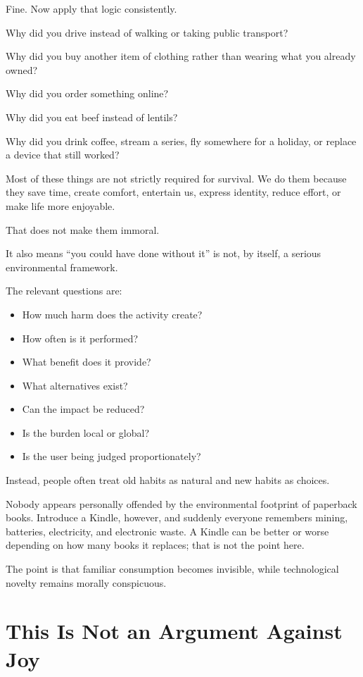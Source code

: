 \documentclass{article}
\begin{document}
Fine. Now apply that logic consistently.

Why did you drive instead of walking or taking public transport?

Why did you buy another item of clothing rather than wearing what you already owned?

Why did you order something online?

Why did you eat beef instead of lentils?

Why did you drink coffee, stream a series, fly somewhere for a holiday, or replace a device that still worked?

Most of these things are not strictly required for survival. We do them because they save time, create comfort, entertain us, express identity, reduce effort, or make life more enjoyable.

That does not make them immoral.

It also means ``you could have done without it'' is not, by itself, a serious environmental framework.

The relevant questions are:

\begin{itemize}[noitemsep]
    \item How much harm does the activity create?
    \item How often is it performed?
    \item What benefit does it provide?
    \item What alternatives exist?
    \item Can the impact be reduced?
    \item Is the burden local or global?
    \item Is the user being judged proportionately?
\end{itemize}

Instead, people often treat old habits as natural and new habits as choices.

Nobody appears personally offended by the environmental footprint of paperback books. Introduce a Kindle, however, and suddenly everyone remembers mining, batteries, electricity, and electronic waste. A Kindle can be better or worse depending on how many books it replaces; that is not the point here.

The point is that familiar consumption becomes invisible, while technological novelty remains morally conspicuous.

\section*{This Is Not an Argument Against Joy}
\end{document}
